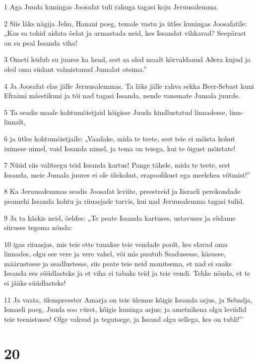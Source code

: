 \par 1 Aga Juuda kuningas Joosafat tuli rahuga tagasi koju Jeruusalemma.
\par 2 Siis läks nägija Jehu, Hanani poeg, temale vastu ja ütles kuningas Joosafatile: „Kas sa tohid aidata õelat ja armastada neid, kes Issandat vihkavad? Seepärast on su peal Issanda viha!
\par 3 Ometi leidub su juures ka head, sest sa oled maalt kõrvaldanud Aðera kujud ja oled oma südant valmistanud Jumalat otsima.”
\par 4 Ja Joosafat elas jälle Jeruusalemmas. Ta läks jälle rahva sekka Beer-Sebast kuni Efraimi mäestikuni ja tõi nad tagasi Issanda, nende vanemate Jumala juurde.
\par 5 Ta seadis maale kohtumõistjaid kõigisse Juuda kindlustatud linnadesse, linn-linnalt,
\par 6 ja ütles kohtumõistjaile: „Vaadake, mida te teete, sest teie ei mõista kohut inimese nimel, vaid Issanda nimel, ja tema on teiega, kui te õigust mõistate!
\par 7 Nüüd siis valitsegu teid Issanda kartus! Pange tähele, mida te teete, sest Issanda, meie Jumala juures ei ole ülekohut, erapoolikust ega meelehea võtmist!”
\par 8 Ka Jeruusalemmas seadis Joosafat leviite, preestreid ja Iisraeli perekondade peamehi Issanda kohtu ja riiuasjade tarvis, kui nad Jeruusalemma tagasi tulid.
\par 9 Ja ta käskis neid, öeldes: „Te peate Issanda kartuses, ustavuses ja südame siiruses tegema nõnda:
\par 10 igas riiuasjas, mis teie ette tuuakse teie vendade poolt, kes elavad oma linnades, olgu see vere ja vere vahel, või mis puutub Seadusesse, käsusse, määrustesse ja seadlustesse, siis peate teie neid manitsema, et nad ei saaks Issanda ees süüdlasteks ja et viha ei tabaks teid ja teie vendi. Tehke nõnda, et te ei jääks süüdlasteks!
\par 11 Ja vaata, ülempreester Amarja on teie ülemus kõigis Issanda asjus, ja Sebadja, Ismaeli poeg, Juuda soo vürst, kõigis kuninga asjus; ja ametnikena olgu leviidid teie teenistuses! Olge vahvad ja tegutsege, ja Issand olgu sellega, kes on tubli!”

\chapter{20}

